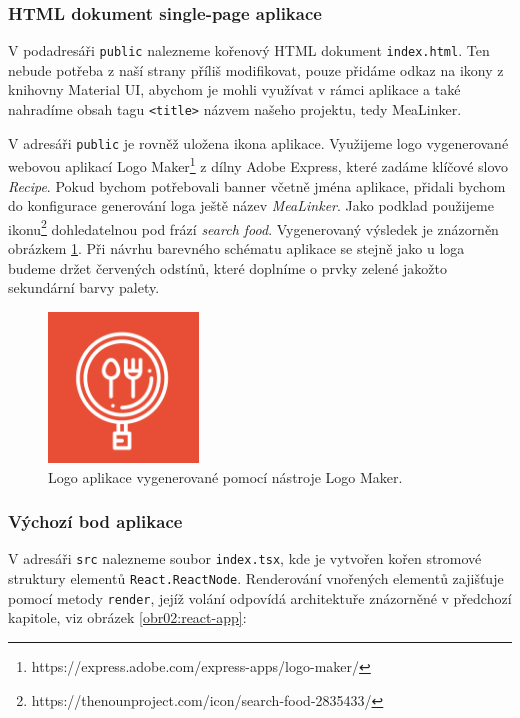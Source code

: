 \subsubsection{HTML dokument single-page aplikace}

V podadresáři \texttt{public} nalezneme kořenový HTML dokument \texttt{index.html}. Ten nebude potřeba z naší strany příliš modifikovat, pouze přidáme odkaz na ikony z knihovny Material UI, abychom je mohli využívat v rámci aplikace a také nahradíme obsah tagu \texttt{<title>} názvem našeho projektu, tedy MeaLinker.

V adresáři \texttt{public} je rovněž uložena ikona aplikace. Využijeme logo vygenerované webovou aplikací Logo Maker\footnote{https://express.adobe.com/express-apps/logo-maker/} z dílny Adobe Express, které zadáme klíčové slovo \emph{Recipe}. Pokud bychom potřebovali banner včetně jména aplikace, přidali bychom do konfigurace generování loga ještě název \emph{MeaLinker}. Jako podklad použijeme ikonu\footnote{https://thenounproject.com/icon/search-food-2835433/} dohledatelnou pod frází \emph{search food}. Vygenerovaný výsledek je znázorněn obrázkem \ref{obr03:mealinker-logo}. Při návrhu barevného schématu aplikace se stejně jako u loga budeme držet červených odstínů, které doplníme o prvky zelené jakožto sekundární barvy palety.

\begin{figure}[h!]\centering
\includegraphics[width=40mm]{../img/mealinker-logo}
\caption{Logo aplikace vygenerované pomocí nástroje Logo Maker.}
\label{obr03:mealinker-logo}
\end{figure}

\subsubsection{Výchozí bod aplikace}

V adresáři \texttt{src} nalezneme soubor \texttt{index.tsx}, kde je vytvořen kořen stromové struktury elementů \texttt{React.ReactNode}. Renderování vnořených elementů zajišťuje pomocí metody \texttt{render}, jejíž volání odpovídá architektuře znázorněné v předchozí kapitole, viz obrázek \ref{obr02:react-app}:

